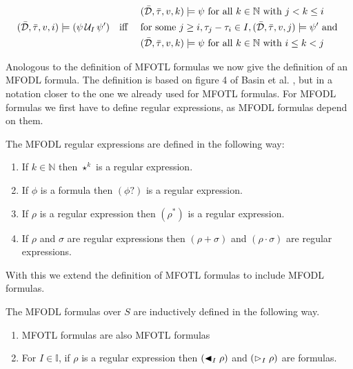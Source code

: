 \begin{definition}
\begin{alignat*}{3}
            &&&&&(\bar{\mathcal{D}}, \bar{\tau}, v, k) \models \psi \text{ for all } k \in \mathbb{N} \text{ with } j < k \leq i \\
        &(\bar{\mathcal{D}},\bar{\tau},v,i) \models (\psi \,\mathcal{U}_{I}\, \psi')
            &&\text{iff } && \text{for some } j \geq i, \tau_j - \tau_i \in I, (\bar{\mathcal{D}}, \bar{\tau}, v, j) \models \psi' \text{ and } \\
            &&&&&(\bar{\mathcal{D}}, \bar{\tau}, v, k) \models \psi \text{ for all } k \in \mathbb{N} \text{ with } i \leq k < j \\
    \end{alignat*}
\end{definition}

Anologous to the definition of MFOTL formulas we now give the definition of an MFODL formula.
The definition is based on figure 4 of Basin et al. \cite{Basin2020}, but in a notation closer to the one we already used for MFOTL formulas.
For MFODL formulas we first have to define regular expressions, as MFODL formulas depend on them.
\renewcommand{\labelenumi}{(\roman{enumi})}
\begin{definition}
    The MFODL regular expressions are defined in the following way:
    \begin{enumerate}
        \item If $k \in \mathbb{N}$ then $\star^k$ is a regular expression.
        \item If $\phi$ is a formula then $(\phi ?)$ is a regular expression.
        \item If $\rho$ is a regular expression then $(\rho^*)$ is a regular expression.
        \item If $\rho$ and $\sigma$ are regular expressions then $(\rho + \sigma)$ and $(\rho \cdot \sigma)$ are regular expressions.
    \end{enumerate}
\end{definition}
With this we extend the definition of MFOTL formulas to include MFODL formulas.
\begin{definition}
    The MFODL formulas over $S$ are inductively defined in the following way.
    \begin{enumerate}
        \item MFOTL formulas are also MFOTL formulas
        \item For $I \in \mathbb{I}$, if $\rho$ is a regular expression then $(\blacktriangleleft_{I} \rho)$ and $(\vartriangleright_{I} \rho)$ are formulas.
    \end{enumerate}
\end{definition}
